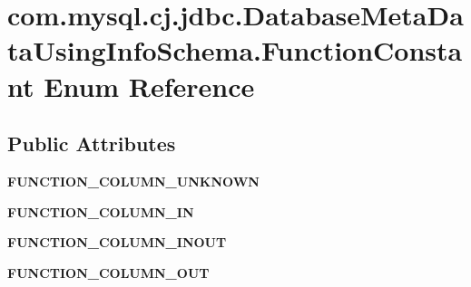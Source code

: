 \hypertarget{enumcom_1_1mysql_1_1cj_1_1jdbc_1_1_database_meta_data_using_info_schema_1_1_function_constant}{}\section{com.\+mysql.\+cj.\+jdbc.\+Database\+Meta\+Data\+Using\+Info\+Schema.\+Function\+Constant Enum Reference}
\label{enumcom_1_1mysql_1_1cj_1_1jdbc_1_1_database_meta_data_using_info_schema_1_1_function_constant}
\subsection*{Public Attributes}
\begin{DoxyCompactItemize}
\item 
\mbox{\label{enumcom_1_1mysql_1_1cj_1_1jdbc_1_1_database_meta_data_using_info_schema_1_1_function_constant_a03936b305f47e198d7eac4aef9cd439d}} 
{\bfseries F\+U\+N\+C\+T\+I\+O\+N\+\_\+\+C\+O\+L\+U\+M\+N\+\_\+\+U\+N\+K\+N\+O\+WN}
\item 
\mbox{\label{enumcom_1_1mysql_1_1cj_1_1jdbc_1_1_database_meta_data_using_info_schema_1_1_function_constant_aab06ff730eb4d8fd6f9458e33786fa26}} 
{\bfseries F\+U\+N\+C\+T\+I\+O\+N\+\_\+\+C\+O\+L\+U\+M\+N\+\_\+\+IN}
\item 
\mbox{\label{enumcom_1_1mysql_1_1cj_1_1jdbc_1_1_database_meta_data_using_info_schema_1_1_function_constant_adc7e4657efc72b54323c9c832f9493a0}} 
{\bfseries F\+U\+N\+C\+T\+I\+O\+N\+\_\+\+C\+O\+L\+U\+M\+N\+\_\+\+I\+N\+O\+UT}
\item 
\mbox{\label{enumcom_1_1mysql_1_1cj_1_1jdbc_1_1_database_meta_data_using_info_schema_1_1_function_constant_a423eb1130277ddc6d9758ef33948907d}} 
{\bfseries F\+U\+N\+C\+T\+I\+O\+N\+\_\+\+C\+O\+L\+U\+M\+N\+\_\+\+O\+UT}
\item 

\end{DoxyCompactItemize}
